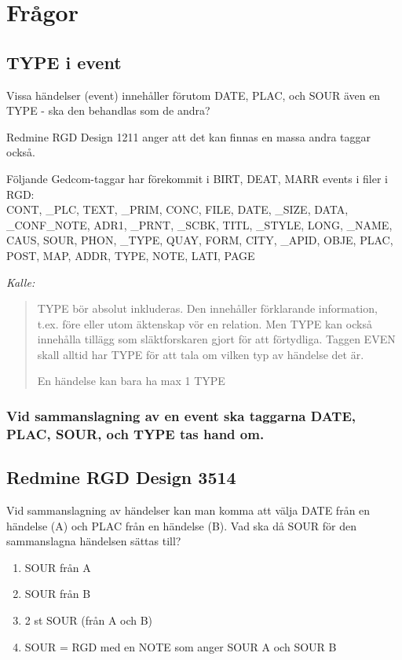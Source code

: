 \documentclass[swedish,11pt]{article}
\begin{document}
\section{Frågor}
\subsection{TYPE i event}
Vissa händelser (event) innehåller förutom DATE, PLAC, och SOUR även en TYPE
- ska den behandlas som de andra?

Redmine RGD Design 1211 anger att det kan finnas en massa andra taggar också.

Följande Gedcom-taggar har förekommit i BIRT, DEAT, MARR events i filer i RGD:\\
CONT,
\_PLC,
TEXT,
\_PRIM,
CONC,
FILE,
DATE,
\_SIZE,
DATA,
\_CONF\_NOTE,
ADR1,
\_PRNT,
\_SCBK,
TITL,
\_STYLE,
LONG,
\_NAME,
CAUS,
SOUR,
PHON,
\_TYPE,
QUAY,
FORM,
CITY,
\_APID,
OBJE,
PLAC,
POST,
MAP,
ADDR,
TYPE,
NOTE,
LATI,
PAGE

{\it Kalle:}
\begin{quotation}
  \label{type}
TYPE bör absolut inkluderas. Den innehåller förklarande information, t.ex. före eller utom äktenskap vör en relation. Men TYPE kan också innehålla tillägg som släktforskaren gjort för att förtydliga.
Taggen EVEN skall alltid har TYPE för att tala om vilken typ av händelse det är.

En händelse kan bara ha max 1 TYPE
\end{quotation}

\subsubsection{Vid sammanslagning av en event ska taggarna DATE, PLAC, SOUR, och TYPE tas hand om.}

\subsection{Redmine RGD Design 3514}

Vid sammanslagning av händelser kan man komma att välja DATE från en händelse (A)
och PLAC från en händelse (B). Vad ska då SOUR för den sammanslagna händelsen sättas till?
\begin{enumerate}
\item SOUR från A
\item SOUR från B
\item 2 st SOUR (från A och B)
\item SOUR = RGD med en NOTE som anger SOUR A och SOUR B
\end{enumerate}
\end{document}
